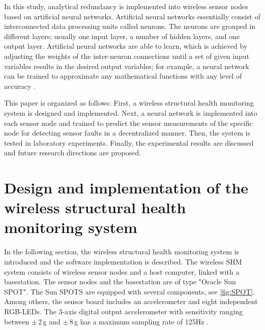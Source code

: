 \documentclass[12pt,a4paper]{scrartcl}
\begin{document}
In this study, analytical redundancy is implemented into wireless sensor nodes based on artificial neural networks.
Artificial neural networks essentially consist of interconnected data processing units called neurons. 
The neurons are grouped in different layers; usually one input layer, a number of hidden layers, and one output layer.
Artificial neural networks are able to learn, which is achieved by adjusting the weights of the inter-neuron connections until a set of given input variables results in the desired output variables; for example, a neural network can be trained to approximate any mathematical functions with any level of accuracy \citep{Li2011}.

This paper is organized as follows:
First, a wireless structural health monitoring system is designed and implemented. 
Next, a neural network is implemented into each sensor node and trained to predict the sensor measurements of the specific node for detecting sensor faults in a decentralized manner. 
Then, the system is tested in laboratory experiments. 
Finally, the experimental results are discussed and future research directions are proposed.


\newpage

\section*{Design and implementation of the wireless structural health monitoring system}
In the following section, the wireless structural health monitoring system is introduced and the software implementation is described.
The wireless SHM system consists of wireless sensor nodes and a host computer, linked with a basestation.
The sensor nodes and the basestation are of type "Oracle Sun SPOT". 
The Sun SPOTS are equipped with several components, see \autoref{fig:SPOT}.
Among others, the sensor board includes an accelerometer and eight independent RGB-LEDs.
The 3-axis digital output accelerometer with sensitivity ranging between $\pm$\,2\,g and $\pm$\,8\,g has a maximum sampling rate of 125Hz \citep{eDemo2010}.
\end{document}

